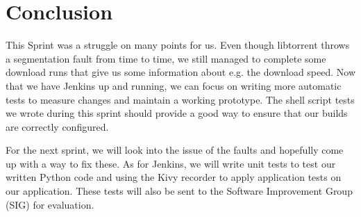 	\section{Conclusion}
		This Sprint was a struggle on many points for us. Even though libtorrent throws a segmentation fault from time to time, we still managed to complete some download runs that give us some information about e.g. the download speed. Now that we have Jenkins up and running, we can focus on writing more automatic tests to measure changes and maintain a working prototype. The shell script tests we wrote during this sprint should provide a good way to ensure that our builds are correctly configured.
		
		For the next sprint, we will look into the issue of the faults and hopefully come up with a way to fix these. As for Jenkins, we will write unit tests to test our written Python code and using the Kivy recorder to apply application tests on our application. These tests will also be sent to the Software Improvement Group (SIG) for evaluation.
